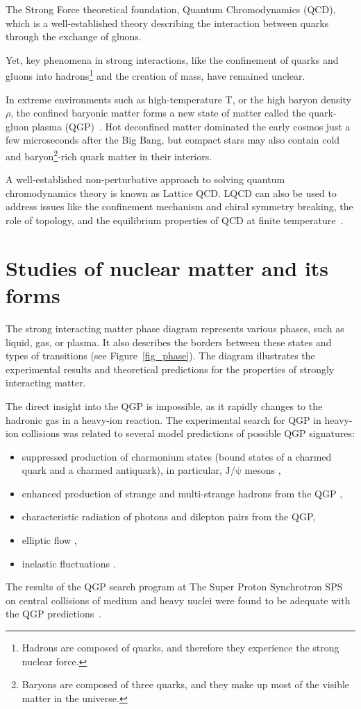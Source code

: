 \newpage

The Strong Force theoretical foundation, Quantum Chromodynamics (QCD), which is a well-established theory describing the interaction between quarks through the exchange of gluons. 

Yet, key phenomena in strong interactions, like the confinement of quarks and gluons into hadrons\footnote{Hadrons are composed of quarks, and therefore they experience the strong nuclear force.} and the creation of mass, have remained unclear.

In extreme environments such as high-temperature T, or the high baryon density $\rho$, the confined baryonic matter forms a new state of matter called the quark-gluon plasma (\gls{QGP})~\cite{phase_diagram}. Hot deconfined matter dominated the early cosmos just a few microseconds after the Big Bang, but compact stars may also contain cold and baryon\footnote{Baryons are composed of three quarks, and they make up most of the visible matter in the universe.}-rich quark matter in their interiors.

A well-established non-perturbative approach to solving quantum chromodynamics theory is known as Lattice \gls{QCD}. LQCD can also be used to address issues like the confinement mechanism and chiral symmetry breaking, the role of topology, and the equilibrium properties of \gls{QCD} at finite temperature~\cite{lattice_qcd}. 

\section{Studies of nuclear matter and its forms}
 The strong interacting matter phase diagram represents various phases, such as liquid, gas, or plasma. It also describes the borders between these states and types of transitions (see Figure~\ref{fig_phase}). The diagram illustrates the experimental results and theoretical predictions for the properties of strongly interacting matter.

The direct insight into the \gls{QGP} is impossible, as it rapidly changes to the hadronic gas in a heavy-ion reaction. The experimental search for \gls{QGP} in heavy-ion collisions was related to several model predictions of possible \gls{QGP} signatures: 
\begin{itemize}
    \item suppressed production of charmonium states (bound states of a charmed quark and a charmed antiquark), in particular, $\mathrm{J/\psi}$ mesons \cite{MATSUI1986416},
    \item enhanced production of strange and multi-strange hadrons from the \gls{QGP} \cite{strageness},
    \item characteristic radiation of photons and dilepton pairs from the \gls{QGP},
    \item elliptic flow \cite{Stefaniak:2022dxo},
    \item inelastic fluctuations \cite{Stefaniak:2022dxo}.
\end{itemize}
The results of the QGP search program at The Super Proton Synchrotron \gls{SPS} on central collisions of medium and heavy nuclei were found to be adequate with the QGP predictions~\cite{Rafelski_2015}.

